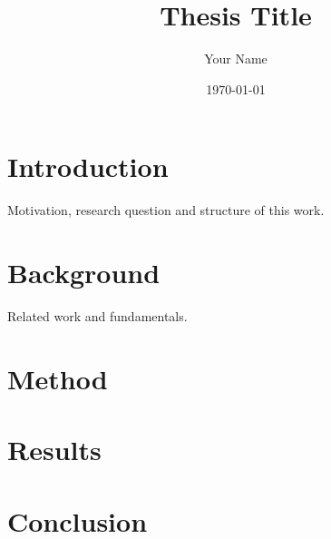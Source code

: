 \documentclass[11pt,a4paper]{report}
\title{Thesis Title}
\author{Your Name}
\date{\today}
\begin{document}
\maketitle
\tableofcontents

\chapter{Introduction}
\label{ch:intro}
Motivation, research question and structure of this work.

\chapter{Background}
\label{ch:background}
Related work and fundamentals.

\chapter{Method}
\label{ch:method}

\chapter{Results}
\label{ch:results}

\chapter{Conclusion}
\label{ch:conclusion}
\end{document}
